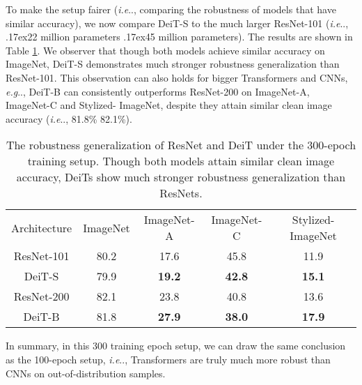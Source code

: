 \documentclass{article}
\makeatletter
\def\vs{{\bm{s}}}
\newcommand{\app}{\raise.17ex\hbox{}}
\DeclareRobustCommand\onedot{\futurelet\@let@token\@onedot}
\def\@onedot{\ifx\@let@token.\else.\null\fi\xspace}
\def\eg{\emph{e.g}\onedot} \def\Eg{\emph{E.g}\onedot}
\def\ie{\emph{i.e}\onedot} \def\Ie{\emph{I.e}\onedot}
\makeatother
\begin{document}
To make the setup fairer (\ie, comparing the robustness of models that have similar accuracy), we now compare DeiT-S to the much larger ResNet-101 (\ie, \app22 million parameters \vs \app45 million parameters). The results are shown in Table \ref{tab:scaleacc}. We observer that though both models achieve similar accuracy on ImageNet, DeiT-S demonstrates much stronger robustness generalization than ResNet-101. This observation can also holds for bigger Transformers and CNNs, \eg, DeiT-B can consistently outperforms ResNet-200 on ImageNet-A, ImageNet-C and Stylized- ImageNet, despite they attain similar clean image accuracy (\ie, 81.8\% \vs 82.1\%). 


\begin{table}[!ht]
\caption{The robustness generalization of ResNet and DeiT under the 300-epoch training setup. Though both models attain similar clean image accuracy, DeiTs show much stronger robustness generalization than ResNets.}
\footnotesize
\centering
\begin{tabular}{c|c|c|c|c}
\shline
 Architecture & ImageNet \textcolor{red}{} & ImageNet-A \textcolor{red}{}& ImageNet-C \textcolor{red}{}& Stylized-ImageNet \textcolor{red}{}\\ \shline 
ResNet-101	  &  80.2 &	17.6&	45.8&	11.9  \\ 

 DeiT-S &  79.9	& \textbf{19.2} &	\textbf{42.8} &	\textbf{15.1}    \\ \shline 

ResNet-200	  &  82.1 &	23.8 &	40.8 &	13.6 \\ 

 DeiT-B &  81.8 &	\textbf{27.9} &	\textbf{38.0} &	\textbf{17.9}    \\ \hline 
\end{tabular}
\vspace{-1em}
\label{tab:scaleacc}
\end{table}



In summary, in this 300 training epoch setup, we can draw the same conclusion as the 100-epoch setup, \ie, Transformers are truly much more robust than CNNs on out-of-distribution samples.
\end{document}
